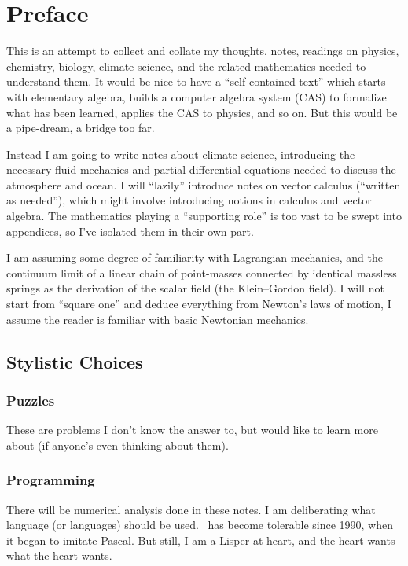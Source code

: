 \chapter*{Preface}

This is an attempt to collect and collate my thoughts, notes, readings
on physics, chemistry, biology, climate science, and the related
mathematics needed to understand them. It would be nice to have a
``self-contained text'' which starts with elementary algebra, builds a
computer algebra system (CAS) to formalize what has been learned,
applies the CAS to physics, and so on. But this would be a pipe-dream, a
bridge too far.

Instead I am going to write notes about climate science, introducing the
necessary fluid mechanics and partial differential equations needed to
discuss the atmosphere and ocean. I will ``lazily'' introduce notes on
vector calculus (``written as needed''), which might involve introducing
notions in calculus and vector algebra. The mathematics playing a
``supporting role'' is too vast to be swept into appendices, so I've
isolated them in their own part.

I am assuming some degree of familiarity with Lagrangian mechanics, and
the continuum limit of a linear chain of point-masses connected by
identical massless springs as the derivation of the scalar field (the
Klein--Gordon field). I will not start from ``square one'' and deduce
everything from Newton's laws of motion, I assume the reader is familiar
with basic Newtonian mechanics.

\section*{Stylistic Choices}

\subsection*{Puzzles} These are problems I don't know the answer to, but
would like to learn more about (if anyone's even thinking about them).

\subsection*{Programming} There will be numerical analysis done in these
notes. I am deliberating what language (or languages) should be
used. \FORTRAN\ has become tolerable since 1990, when it began to
imitate Pascal. But still, I am a Lisper at heart, and the heart wants
what the heart wants.


